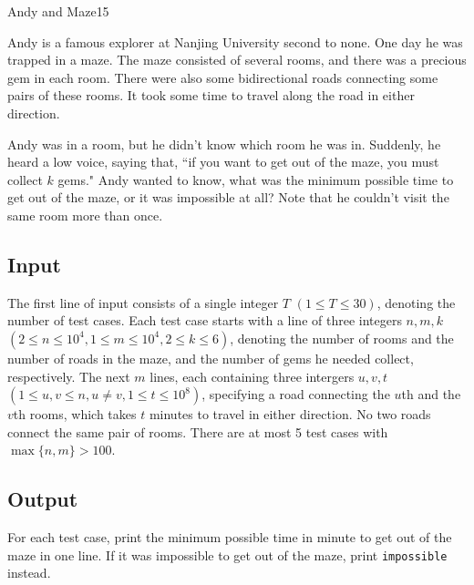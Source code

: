 \begin{Problem}{Andy and Maze}{15}

Andy is a famous explorer at Nanjing University second to none. One day he was trapped in a maze. The maze consisted of several rooms, and there was a precious gem in each room. There were also some bidirectional roads connecting some pairs of these rooms. It took some time to travel along the road in either direction.

Andy was in a room, but he didn't know which room he was in. Suddenly, he heard a low voice, saying that, ``if you want to get out of the maze, you must collect $k$ gems." Andy wanted to know, what was the minimum possible time to get out of the maze, or it was impossible at all? Note that he couldn't visit the same room more than once.

\subsection*{Input}

The first line of input consists of a single integer $T$ $(1 \leq T \leq 30)$, denoting the number of test cases. Each test case starts with a line of three integers $n, m, k$ $(2 \leq n \leq 10^4, 1 \leq m \leq 10^4, 2 \leq k \leq 6)$, denoting the number of rooms and the number of roads in the maze, and the number of gems he needed collect, respectively. The next $m$ lines, each containing three intergers $u, v, t$ $(1 \leq u, v \leq n, u \neq v, 1 \leq t \leq 10^8)$, specifying a road connecting the $u$th and the $v$th rooms, which takes $t$ minutes to travel in either direction. No two roads connect the same pair of rooms.
There are at most 5 test cases with $\max\{n, m\} > 100$.

\subsection*{Output}

For each test case, print the minimum possible time in minute to get out of the maze in one line. If it was impossible to get out of the maze, print \texttt{impossible} instead.


\end{Problem}
